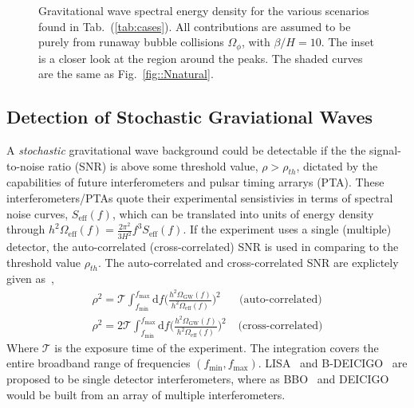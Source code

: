 \documentclass[nofootinbib,twocolumn,preprintnumbers]{revtex4-1}
\begin{document}
\begin{figure}[tb]
\begin{minipage}[c]{\textwidth}
\end{minipage}
\hfill
\caption{ Gravitational wave spectral energy density for the various scenarios found in Tab.~(\ref{tab:cases}).  All contributions are assumed to be purely from runaway bubble collisions $\Omega_{\phi}$, with $\beta/H  = 10$. The inset is a closer look at the region around the peaks. The shaded curves are the same as Fig.~\ref{fig::Nnatural}.   }
\label{fig:Haa}
\end{figure}


\subsection{Detection of Stochastic Graviational Waves}
\label{sec:detection}
A \textit{stochastic} gravitational wave background could be detectable if the the signal-to-noise ratio (SNR) is above some threshold value, $\rho > \rho_{th}$, dictated by the capabilities of future interferometers and pulsar timing arrarys (PTA). These interferometers/PTAs quote their experimental sensistivies in terms of spectral noise curves, $S_{\textrm{eff}}(f)$, which can be translated into units of energy density through $h^2 \Omega_{\textrm{eff}}(f) = \frac{2\pi^2}{3H^2}f^3 S_{\textrm{eff}}(f)$. If the experiment uses a single (multiple) detector, the auto-correlated (cross-correlated) SNR is used in comparing to the threshold value $\rho_{th}$. The auto-correlated and cross-correlated SNR are explictely given as~\cite{PhysRevD.59.102001},
\begin{equation}\label{eqn::SNR}
\begin{split}
\rho^2 =  \mathcal{T} \int_{f_{\textrm{min}}}^{f_{\textrm{max}}}\textrm{d}f \bigg( \frac{h^2 \Omega_{\textrm{GW}}(f)}{h^2 \Omega_{\textrm{eff}}(f)} \bigg)^2 \;\;\;\;\;\; \textrm{(auto-correlated)}
\\
\rho^2 = 2 \mathcal{T} \int_{f_{\textrm{min}}}^{f_{\textrm{max}}}\textrm{d}f \bigg( \frac{h^2 \Omega_{\textrm{GW}}(f)}{h^2 \Omega_{\textrm{eff}}(f)} \bigg)^2 \;\;\;\: \textrm{(cross-correlated)}
\end{split}
\end{equation}
Where $\mathcal{T}$ is the exposure time of the experiment. The integration covers the entire broadband range of frequencies $(f_{\textrm{min}}, f_{\textrm{max}})$. LISA~\citep{Audley:2017drz} and B-DEICIGO~\citep{10.1093/ptep/pty078} are proposed to be single detector interferometers, where as BBO~\citep{PhysRevD.72.083005} and DEICIGO~\citep{Sato_2017} would be built from an array of multiple interferometers.
\end{document}
